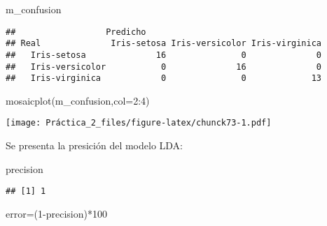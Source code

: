 \documentclass[
]{article}
\newenvironment{Shaded}{\begin{snugshade}}{\end{snugshade}}
\newcommand{\AttributeTok}[1]{\textcolor[rgb]{0.77,0.63,0.00}{#1}}
\newcommand{\CommentTok}[1]{\textcolor[rgb]{0.56,0.35,0.01}{\textit{#1}}}
\newcommand{\DecValTok}[1]{\textcolor[rgb]{0.00,0.00,0.81}{#1}}
\newcommand{\FunctionTok}[1]{\textcolor[rgb]{0.00,0.00,0.00}{#1}}
\newcommand{\NormalTok}[1]{#1}
\newcommand{\OtherTok}[1]{\textcolor[rgb]{0.56,0.35,0.01}{#1}}
\newcommand{\SpecialCharTok}[1]{\textcolor[rgb]{0.00,0.00,0.00}{#1}}
\begin{document}
\begin{Shaded}
\begin{Highlighting}[]
\NormalTok{m\_confusion}
\end{Highlighting}
\end{Shaded}

\begin{verbatim}
##                  Predicho
## Real              Iris-setosa Iris-versicolor Iris-virginica
##   Iris-setosa              16               0              0
##   Iris-versicolor           0              16              0
##   Iris-virginica            0               0             13
\end{verbatim}

\begin{Shaded}
\begin{Highlighting}[]
\FunctionTok{mosaicplot}\NormalTok{(m\_confusion,}\AttributeTok{col=}\DecValTok{2}\SpecialCharTok{:}\DecValTok{4}\NormalTok{)}
\end{Highlighting}
\end{Shaded}

\texttt{[image: Práctica\_2\_files/figure-latex/chunck73-1.pdf]}

Se presenta la presición del modelo LDA:

\begin{Shaded}
\end{Shaded}

\begin{Shaded}
\begin{Highlighting}[]
\NormalTok{precision}
\end{Highlighting}
\end{Shaded}

\begin{verbatim}
## [1] 1
\end{verbatim}

\begin{Shaded}
\begin{Highlighting}[]
\NormalTok{error}\OtherTok{=}\NormalTok{(}\DecValTok{1}\SpecialCharTok{{-}}\NormalTok{precision)}\SpecialCharTok{*}\DecValTok{100}
\end{Highlighting}
\end{Shaded}
\end{document}
